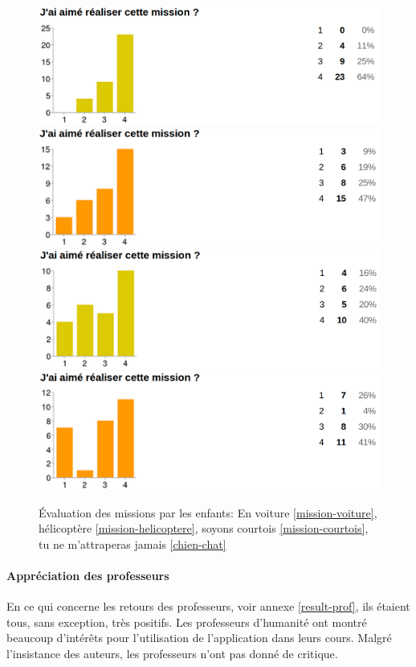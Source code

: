 \begin{figure}[ht]
  \begin{center}
    \includegraphics[width=.7\textwidth]{content/8-validation/images/voiture}
    \includegraphics[width=.7\textwidth]{content/8-validation/images/helico}
    \includegraphics[width=.7\textwidth]{content/8-validation/images/courtois}
    \includegraphics[width=.7\textwidth]{content/8-validation/images/chien}
    \caption{Évaluation des missions par les enfants: En voiture \ref{mission-voiture}, hélicoptère \ref{mission-helicoptere}, soyons courtois \ref{mission-courtois}, tu ne m'attraperas jamais \ref{chien-chat}}
    \label{fig:evaluation-mission}
  \end{center}
\end{figure}

\paragraph{Appréciation des professeurs}
En ce qui concerne les retours des professeurs, voir annexe \ref{result-prof}, ils étaient tous, sans exception, très positifs. Les professeurs d'humanité ont montré beaucoup d'intérêts pour l'utilisation de l'application dans leurs cours. Malgré l'insistance des auteurs, les professeurs n'ont pas donné de critique.

